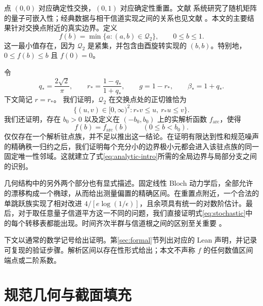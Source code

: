 \documentclass[UTF8,11pt,a4paper,fontset=fandol]{ctexart}
\theoremstyle{definition}
\theoremstyle{remark}
\newcommand{\Q}{\mathcal Q_2}
\begin{document}
点 \((0,0)\) 对应确定性交换，\((0,1)\) 对应确定性重置。文献 \cite{Shahbeigi2024} 系统研究了随机矩阵的量子可嵌入性；经典数据与相干信道实现之间的关系也见文献 \cite{Korzekwa2018}。本文的主要结果针对交换点附近的真实边界。定义
\begin{equation}\label{eq:fdefinition}
 f(b)=\min\{a:(a,b)\in\Q\},\qquad 0\leq b\leq1.
\end{equation}
这一最小值存在，因为 \(\Q\) 是紧集，并包含由酉旋转实现的 \((b,b)\)。特别地，\(0\leq f(b)\leq b\) 且 \(f(0)=0\)。

令
\begin{equation}\label{eq:constants}
 q_*=\frac{2\sqrt2}{\pi},\qquad
 r_*=\frac{1-q_*}{1+q_*},\qquad
 g=1-r_*,\qquad \beta_*=1+q_*.
\end{equation}
下文简记 \(r=r_*\)。
我们证明，\(\Q\) 在交换点处的正切锥恰为
\begin{equation}\label{eq:cone-intro}
 \{(u,v)\in[0,\infty)^2:r_*v\leq u,\ r_*u\leq v\}.
\end{equation}
我们还证明，存在 \(b_0>0\) 以及定义在 \((-b_0,b_0)\) 上的实解析函数 \(f_{\mathrm{arc}}\)，使得
\begin{equation}\label{eq:analytic-intro}
 f(b)=f_{\mathrm{arc}}(b)\qquad(0\leq b<b_0).
\end{equation}
仅仅存在一个解析驻点族，并不足以推出这一结论。在证明有限达到性和规范噪声的精确秩一归约之后，我们证明每个充分小的边界极小元都会进入该驻点族的同一固定唯一性邻域。这就建立了式\eqref{eq:analytic-intro}所需的全局边界与局部分支之间的识别。

几何结构中的另外两个部分也有显式描述。固定线性 Bloch 动力学后，全部允许的漂移构成一个椭球，从而给出测量偏置的精确区间。在重置点附近，一个合法的单跳跃族实现了相对改进 \(4/[e\log(1/\epsilon)]\)，且余项具有统一的对数阶估计。最后，对于取任意量子信道平方这一不同的问题，我们直接证明式\eqref{eq:stochastic}中的每个转移表都能出现。时间齐次半群与信道根之间的区别至关重要 \cite{WolfCirac2008}。

下文以通常的数学记号给出证明。第\ref{sec:formal}节列出对应的 Lean 声明，并记录可复现的验证步骤。解析区间以存在性形式给出；本文不声称 \(f\) 的任何数值区间端点或二阶系数。

\section{规范几何与截面填充}\label{sec:geometry}
\end{document}
